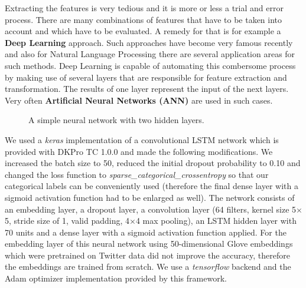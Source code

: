 \documentclass[journal, a4paper, 12pt]{IEEEtran}
\begin{document}
Extracting the features is very tedious and it is more or less a trial and error process. There are many combinations of features that have to be taken into account and which have to be evaluated. A remedy for that is for example a \textbf{Deep Learning} approach. Such approaches have become very famous recently and also for Natural Language Processing there are several application areas for such methods. Deep Learning is capable of automating this combersome process by making use of several layers that are responsible for feature extraction and transformation. The results of one layer represent the input of the next layers. Very often \textbf{Artificial Neural Networks (ANN)} are used in such cases.\newline
\begin{figure}[h]
	\caption{A simple neural network with two hidden layers.}
	\centering
	\vspace{5mm}
\end{figure}
We used a \textit{keras} implementation of a convolutional LSTM network which is provided with DKPro TC 1.0.0 and made the following modifications. We increased the batch size to 50, reduced the initial dropout probability to 0.10 and changed the loss function to \textit{sparse\_categorical\_crossentropy} so that our categorical labels can be conveniently used (therefore the final dense layer with a sigmoid activation function had to be enlarged as well). The network consists of an embedding layer, a dropout layer, a convolution layer (64 filters, kernel size 5$\times$5, stride size of 1, valid padding, 4$\times$4 max pooling), an LSTM hidden layer with 70 units and a dense layer with a sigmoid activation function applied. For the embedding layer of this neural network using 50-dimensional Glove embeddings which were pretrained on Twitter data did not improve the accuracy, therefore the embeddings are trained from scratch. We use a \textit{tensorflow} backend and the Adam optimizer implementation provided by this framework.\\
\end{document}
